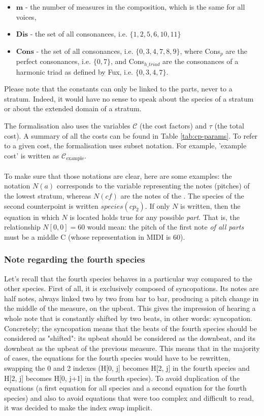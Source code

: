 \begin{itemize}
    \item $\textbf{m}$ - the number of measures in the composition, which is the same for all voices,
    \item $\textbf{Dis}$ - the set of all consonances, i.e. $\{1, 2,5, 6, 10, 11\}$
    \item $\textbf{Cons}$ - the set of all consonances, i.e. $\{0, 3, 4, 7, 8, 9\}$, where Cons$_p$ are the perfect consonances, i.e. $\{0, 7\}$, and Cons$_{h\_triad}$ are the consonances of a harmonic triad as defined by Fux, i.e. $\{0, 3, 4, 7\}$.
\end{itemize}
Please note that the constants can only be linked to the parts, never to a stratum. Indeed, it would have no sense to speak about the species of a stratum or about the extended domain of a stratum.

The formalisation also uses the variables $\mathcal{C}$ (the cost factors) and $\tau$ (the total cost). A summary of all the costs can be found in Table \ref{tab:cp-params}. To refer to a given cost, the formalisation uses subset notation. For example, 'example cost' is written as $\mathcal{C}_{\text{example}}$.

\paragraph{}
To make sure that those notations are clear, here are some examples: the notation $N(a)$ corresponds to the variable representing the notes (pitches) of the lowest stratum, whereas $N(\mathit{cf})$ are the notes of the \cf. The species of the second counterpoint is written $species(cp_2)$. If only $N$ is written, then the equation in which $N$ is located holds true for any possible \textit{part}. That is, the relationship $N[0, 0] = 60$ would mean: the pitch of the first note \textit{of all parts} must be a middle C (whose representation in MIDI is 60).

\subsubsection{Note regarding the fourth species}\label{nota-bene-4th-species} Let's recall that the fourth species behaves in a particular way compared to the other species. First of all, it is exclusively composed of syncopations. Its notes are half notes, always linked two by two from bar to bar, producing a pitch change in the middle of the measure, on the upbeat. This gives the impression of hearing a whole note that is constantly shifted by two beats, in other words: syncopation.
Concretely; the syncopation means that the beats of the fourth species should be considered as "shifted": its upbeat should be considered as the downbeat, and its downbeat as the upbeat of the previous measure. This means that in the majority of cases, the equations for the fourth species would have to be rewritten, swapping the 0 and 2 indexes (H[0, j] becomes H[2, j] in the fourth species and H[2, j] becomes H[0, j+1] in the fourth species). To avoid duplication of the equations (a first equation for all species and a second equation for the fourth species) and also to avoid equations that were too complex and difficult to read, it was decided to make the index swap implicit.

